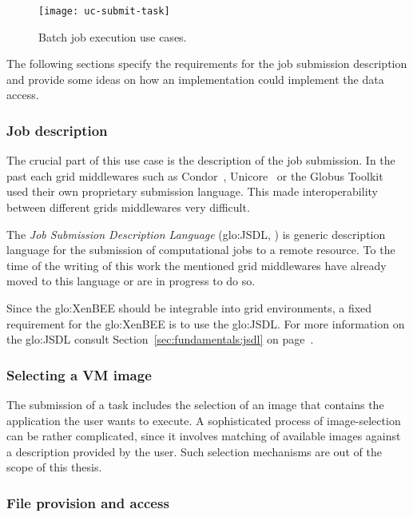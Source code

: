\begin{figure}[ht]
  \centering
  \texttt{[image: uc-submit-task]}
  \caption{Batch job execution use cases.}
  \label{fig:uc-batch-job-execution}
\end{figure}

The  following sections specify  the requirements  for the  job submission
description  and  provide  some  ideas  on  how  an  implementation  could
implement the data access.

\subsubsection{Job description}

The  crucial  part  of  this  use  case is  the  description  of  the  job
submission.     In   the    past   each    grid   middlewares    such   as
Condor~\cite{condor},     Unicore~\cite{unicore}     or     the     Globus
Toolkit~\cite{globus}  used  their  own proprietary  submission  language.
This  made  interoperability  between  different  grids  middlewares  very
difficult.

The   \emph{Job    Submission   Description   Language}   (\gls{glo:JSDL},
\cite{jsdl-spec}) is  generic description  language for the  submission of
computational jobs  to a remote  resource. To the  time of the  writing of
this  work the  mentioned  grid  middlewares have  already  moved to  this
language or are in progress to do so.

Since the \gls{glo:XenBEE} should  be integrable into grid environments, a
fixed requirement  for the \gls{glo:XenBEE} is to  use the \gls{glo:JSDL}.
For     more     information     on     the     \gls{glo:JSDL}     consult
Section~\ref{sec:fundamentals:jsdl}                                      on
page~\pageref{sec:fundamentals:jsdl}.

\subsubsection{Selecting a VM image}

The submission of a task includes  the selection of an image that contains
the application  the user  wants to execute.   A sophisticated  process of
image-selection can  be rather complicated, since it  involves matching of
available  images  against  a  description  provided by  the  user.   Such
selection mechanisms are out of the scope of this thesis.

\subsubsection{File provision and access}

